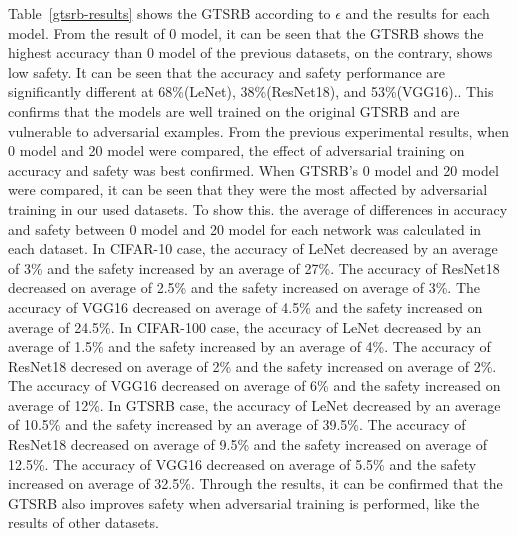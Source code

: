 \documentclass[journal,article,submit,moreauthors,pdftex]{Definitions/mdpi}
\begin{document}
Table~\ref{gtsrb-results} shows the GTSRB according to \begin{math}\epsilon\end{math} and the results for each model.
From the result of 0 model, it can be seen that the GTSRB shows the highest accuracy than 0 model of the previous datasets, on the contrary, shows low safety.
It can be seen that the accuracy and safety performance are significantly different at 68\%(LeNet), 38\%(ResNet18), and 53\%(VGG16)..
This confirms that the models are well trained on the original GTSRB and are vulnerable to adversarial examples.
From the previous experimental results, when 0 model and 20 model were compared, the effect of adversarial training on accuracy and safety was best confirmed.
When GTSRB's 0 model and 20 model were compared, it can be seen that they were the most affected by adversarial training in our used datasets.
To show this. the average of differences in accuracy and safety between 0 model and 20 model for each network was calculated in each dataset.
In CIFAR-10 case, the accuracy of LeNet decreased by an average of 3\% and the safety increased by an average of 27\%.
The accuracy of ResNet18 decreased on average of 2.5\% and the safety increased on average of 3\%.
The accuracy of VGG16 decreased on average of 4.5\% and the safety increased on average of 24.5\%.
In CIFAR-100 case, the accuracy of LeNet decreased by an average of 1.5\% and the safety increased by an average of 4\%.
The accuracy of ResNet18 decresed on average of 2\% and the safety increased on average of 2\%.
The accuracy of VGG16 decreased on average of 6\% and the safety increased on average of 12\%.
In GTSRB case, the accuracy of LeNet decreased by an average of 10.5\% and the safety increased by an average of 39.5\%.
The accuracy of ResNet18 decreased on average of 9.5\% and the safety increased on average of 12.5\%.
The accuracy of VGG16 decreased on average of 5.5\% and the safety increased on average of 32.5\%.
Through the results, it can be confirmed that the GTSRB also improves safety when adversarial training is performed, like the results of other datasets.
\end{document}
